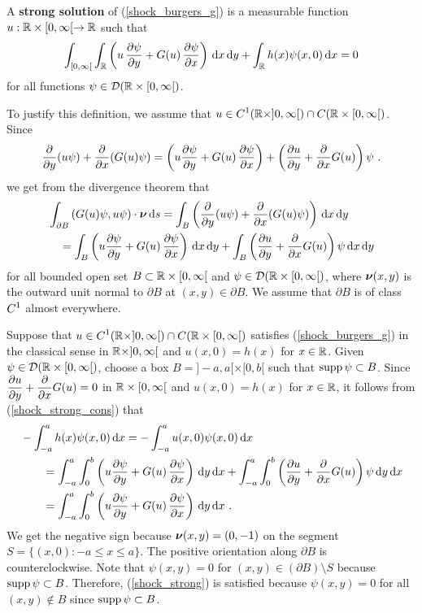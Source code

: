 \begin{defn}
A {\bfseries strong solution}
of (\ref{shock_burgers_g}) is a measurable function $u:\RR\times [0,\infty[
\rightarrow \RR$ such that
\begin{equation} \label{shock_strong}
\int_{[0,\infty[} \int_{\RR}
\left(u\,\pdydx{\psi}{y} + G(u)\,\pdydx{\psi}{x} \right) \dx{x}\dx{y}
+ \int_{\RR} h(x) \psi(x,0) \dx{x} = 0
\end{equation}
for all functions $\psi \in \DD(\RR \times [0,\infty[)$.
\end{defn}

To justify this definition, we assume that
$\DS u \in C^1(\RR \times ]0,\infty[) \cap C(\RR \times [0,\infty[)$.
Since
\[
\pdfdx{(u\psi)}{y} + \pdfdx{( G(u) \psi)}{x}
= \left( u \pdydx{\psi}{y} + G(u)\,\pdydx{\psi}{x} \right) +
\left( \pdydx{u}{y} + \pdfdx{G(u)}{x}\right) \psi \ .
\]
we get from the divergence theorem that
\begin{equation} \label{shock_strong_cons}
\begin{split}
&\int_{\partial B} \left( G(u) \psi, u \psi\right)\cdot \VEC{\nu} \dx{s}
=\int_B \left( \pdfdx{(u\psi)}{y} + \pdfdx{( G(u) \psi)}{x} \right)
\dx{x}\dx{y} \\
&\quad = \int_B \left( u \pdydx{\psi}{y} + G(u)\,\pdydx{\psi}{x}
\right) \dx{x}\dx{y}
+ \int_B \left( \pdydx{u}{y} + \pdfdx{G(u)}{x}\right) \psi \dx{x}\dx{y}
\end{split}
\end{equation}
for all bounded open set $B \subset \RR\times [0,\infty[$
and $\psi \in \DD(\RR\times [0,\infty[)$,
where $\DS \VEC{\nu}(x,y)$ is the outward unit normal to
$\partial B$ at $(x,y) \in \partial B$.  We assume that $\partial B$
is of class $\DS C^1$ almost everywhere.

Suppose that
$\DS u \in C^1(\RR \times ]0,\infty[) \cap C(\RR \times [0,\infty[)$
satisfies (\ref{shock_burgers_g}) in the classical
sense in $\RR \times ]0,\infty[$ and $u(x,0) = h(x)$ for $x \in \RR$.
Given $\psi \in \DD(\RR \times [0,\infty[)$,
choose a box $B = ]-a,a[\times[0,b[$ such that $\supp \psi \subset B$.
Since $\DS \pdydx{u}{y} + \pdfdx{G(u)}{x} = 0$ in
$\RR\times [0,\infty[$ and $u(x,0) = h(x)$ for $x\in \RR$, it follows
from (\ref{shock_strong_cons}) that
\begin{align*}
&-\int_{-a}^a h(x)\psi(x,0) \dx{x} = -\int_{-a}^a u(x,0)\psi(x,0) \dx{x} \\
&\qquad = \int_{-a}^a \int_0^b
\left( u \pdydx{\psi}{y} + G(u)\,\pdydx{\psi}{x} \right) \dx{y}\dx{x}
+ \int_{-a}^a \int_0^b  \left( \pdydx{u}{y} + \pdfdx{G(u)}{x}\right)
\psi \dx{y}\dx{x} \\
&\qquad = \int_{-a}^a \int_0^b
\left( u \pdydx{\psi}{y} + G(u)\,\pdydx{\psi}{x} \right) \dx{y}\dx{x} \ .
\end{align*}
We get the negative sign because $\VEC{\nu}(x,y) = (0,-1)$ on the segment
$S = \{(x,0) : -a \leq x \leq a\}$.  The positive orientation along
$\partial B$ is counterclockwise.  Note that
$\psi(x,y) = 0$ for $(x,y) \in (\partial B) \setminus S$
because $\supp \psi \subset B$.
Therefore, (\ref{shock_strong}) is satisfied because
$\psi(x,y) = 0$ for all $(x,y)\not\in B$ since $\supp \psi \subset B$.

